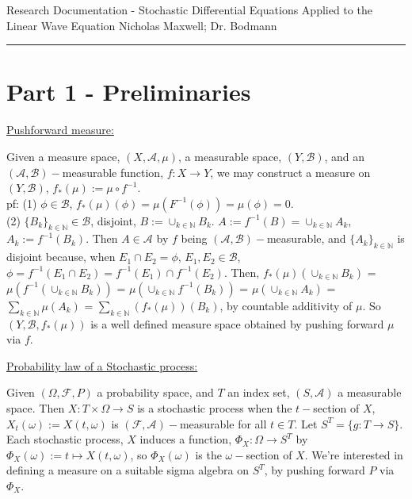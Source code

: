 \documentclass[12pt]{article}
\newcommand{\nats}[0] { \mathbb{N}}
\newcommand{\A}[0] { \mathcal{A} }
\newcommand{\B}[0] { \mathcal{B} }
\newcommand{\F}[0] { \mathcal{F} }
\begin{document}
\begin{flushleft}
Research Documentation - Stochastic Differential Equations Applied to the Linear Wave Equation
Nicholas Maxwell; Dr. Bodmann\\
\end{flushleft}

\begin{flushleft}
\addvspace{5pt} \hrule
\end{flushleft}	



\section*{Part 1 - Preliminaries}

\begin{flushleft}
\underline{Pushforward measure:}
\end{flushleft}

\begin{flushleft}
Given a measure space, $(X,\A,\mu)$, a measurable space, $(Y,\B)$, and an $(\A,\B)-$measurable function, $f:X \rightarrow Y$, we may construct a measure on $(Y,\B)$,  $f_*(\mu) := \mu \circ f^{-1}$.\\
pf: (1) $\phi \in \B$, $f_*(\mu) (\phi) = \mu(F^{-1}(\phi)) = \mu(\phi) = 0$. \\
(2) $\{ B_k \}_{k \in \nats } \in \B $, disjoint, $B := \cup_{k \in \nats} B_k$. $A := f^{-1}(B) = \cup_{k \in \nats} A_k $, $A_k := f^{-1}(B_k)$. Then $A \in \A$ by $f$ being $(\A,\B)-$measurable, and $\{ A_k \}_{k \in \nats }$ is disjoint because, when $E_1 \cap E_2 = \phi$, $E_1, E_2 \in \B$, $ \phi = f^{-1}(E_1 \cap E_2) = f^{-1}(E_1) \cap f^{-1}(E_2)$. Then, $f_*(\mu) ( \cup_{k \in \nats} B_k )$  = $\mu( f^{-1}( \cup_{k \in \nats} B_k ) )$ = $\mu( \cup_{k \in \nats} f^{-1}( B_k ) )$ = $\mu( \cup_{k \in \nats} A_k )$ = $ \sum_{k \in \nats } \mu( A_k ) $ = $ \sum_{k \in \nats } (f_*(\mu))( B_k ) $, by countable additivity of $\mu$. So $ (Y,\B,f_*(\mu))$ is a well defined measure space obtained by pushing forward $\mu$ via $f$.
\end{flushleft}


\begin{flushleft}
\underline{Probability law of a Stochastic process:}
\end{flushleft}

\begin{flushleft}
Given $(\Omega,\F,P)$ a probability space, and $T$ an index set, $(S, \A)$ a measurable space. Then $X: T \times \Omega \rightarrow S$ is a stochastic process when the $t-$section of $X$, $X_t(\omega) := X(t,\omega)$ is $(\F,\A)-$measurable for all $t \in T$. Let $S^T = \{ g: T \rightarrow S \}$. \\
Each stochastic process, $X$ induces a function, $\Phi_X: \Omega \rightarrow S^T$ by $\Phi_X(\omega) := t \mapsto X(t,\omega)$, so $\Phi_X (\omega)$ is the $\omega-$section of $X$. We're interested in defining a measure on a suitable sigma algebra on $S^T$, by pushing forward $P$ via $\Phi_X$.
\end{flushleft}
\end{document}
